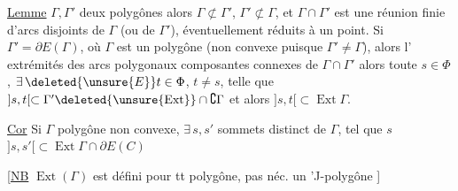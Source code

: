 \uline{Lemme}  $\Gamma,\Gamma'$ deux polygônes   alors $\Gamma\not\subset\Gamma'$, $\Gamma'\not\subset\Gamma$, et $\Gamma\cap\Gamma'$ est une réunion finie d'arcs disjoints de $\Gamma$ (ou de $\Gamma'$), éventuellement réduits à un point.
Si $\Gamma'=\partial E(\Gamma)$, où $\Gamma$ est un polygône (non convexe puisque $\Gamma'\ne\Gamma$), alors l'  extrémités des arcs polygonaux composantes connexes de $\Gamma\cap\Gamma'$   alors toute  $s\in\Phi$, $\exists\,\deleted{\unsure{E}}t\in\Phi$, $t\ne s$, telle que $]s,t[\subset\Gamma'\deleted{\unsure{\operatorname{Ext}}}\cap\complement\Gamma$ et alors $]s,t[\subset\operatorname{Ext}\Gamma$.


\uline{Cor} Si $\Gamma$ polygône non convexe, $\exists\,s,s'$ sommets distinct de $\Gamma$, tel que $s$  $]s,s'[\subset\operatorname{Ext}\Gamma\cap\partial E(C)$

[\uline{NB} $\operatorname{Ext}(\Gamma)$ est défini pour tt polygône, pas néc. un 'J-polygône ]

